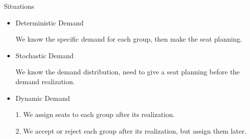     \begin{frame}{Situations}
      \begin{itemize}
        \item Deterministic Demand
        
        We know the specific demand for each group, then make the seat planning.
        \item Stochastic Demand
        
        We know the demand distribution, need to give a seat planning before the demand realization.
    
        \item Dynamic Demand
    
        1. We assign seats to each group after its realization.
    
        2. We accept or reject each group after its realization, but assign them later.
    
      \end{itemize}
    \end{frame}